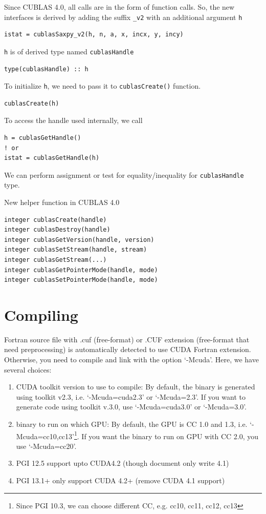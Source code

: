 Since CUBLAS 4.0, all calls are in the form of function calls. So, the
new interfaces is derived by adding the suffix \verb!_v2! with an
additional argument \verb!h!
\begin{lstlisting}
istat = cublasSaxpy_v2(h, n, a, x, incx, y, incy)
\end{lstlisting}
\verb!h! is of derived type named \verb!cublasHandle!
\begin{lstlisting}
type(cublasHandle) :: h
\end{lstlisting}
To initialize \verb!h!, we need to pass it to \verb!cublasCreate()!
function. 
\begin{lstlisting}
cublasCreate(h)
\end{lstlisting}
To access the handle used internally, we call
\begin{lstlisting}
h = cublasGetHandle()
! or
istat = cublasGetHandle(h)
\end{lstlisting}
We can perform assignment or test for equality/inequality for
\verb!cublasHandle! type. 


New helper function in CUBLAS 4.0
\begin{lstlisting}
integer cublasCreate(handle)
integer cublasDestroy(handle)
integer cublasGetVersion(handle, version)
integer cublasSetStream(handle, stream)
integer cublasGetStream(...)
integer cublasGetPointerMode(handle, mode)
integer cublasSetPointerMode(handle, mode)
\end{lstlisting}

\section{Compiling}
\label{sec:compiling-1}

Fortran source file with .cuf (free-format) or .CUF extension
(free-format that need preprocessing) is automatically detected to use
CUDA Fortran extension.  Otherwise, you need to compile and link with
the option `-Mcuda'. 
Here, we have several choices:
\begin{enumerate}
\item CUDA toolkit version to use to compile: By default, the binary
  is generated using toolkit v2.3, i.e. `-Mcuda=cuda2.3' or
  `-Mcuda=2.3'. If you want to generate code using toolkit v.3.0, use
  `-Mcuda=cuda3.0' or `-Mcuda=3.0'.
\item binary to run on which GPU: By default, the GPU is CC 1.0 and
  1.3, i.e.
  `-Mcuda=cc10,cc13'\footnote{Since PGI 10.3, we can choose different
    CC, e.g. cc10, cc11, cc12, cc13}.
  If you want the binary to run on GPU with CC 2.0, you use
  `-Mcuda=cc20'.
  \item PGI 12.5 support upto CUDA4.2 (though document only write 4.1)
  \item PGI 13.1+ only support CUDA 4.2+ (remove CUDA 4.1 support)
\end{enumerate}

